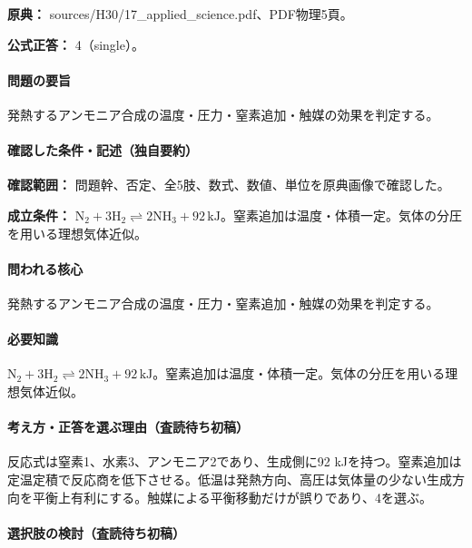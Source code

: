 \noindent\textbf{原典：} sources/H30/17\_applied\_science.pdf、PDF物理5頁。

\textbf{公式正答：} 4（single）。

\paragraph{問題の要旨} 発熱するアンモニア合成の温度・圧力・窒素追加・触媒の効果を判定する。

\paragraph{確認した条件・記述（独自要約）}\mbox{}\par

\noindent\textbf{確認範囲：} 問題幹、否定、全5肢、数式、数値、単位を原典画像で確認した。\par

\noindent\textbf{成立条件：} \(\mathrm{N_2+3H_2\rightleftharpoons2NH_3}+92\,\mathrm{kJ}\)。窒素追加は温度・体積一定。気体の分圧を用いる理想気体近似。\par

\paragraph{問われる核心} 発熱するアンモニア合成の温度・圧力・窒素追加・触媒の効果を判定する。

\paragraph{必要知識} \(\mathrm{N_2+3H_2\rightleftharpoons2NH_3}+92\,\mathrm{kJ}\)。窒素追加は温度・体積一定。気体の分圧を用いる理想気体近似。

\paragraph{考え方・正答を選ぶ理由（査読待ち初稿）} 反応式は窒素1、水素3、アンモニア2であり、生成側に92 kJを持つ。窒素追加は定温定積で反応商を低下させる。低温は発熱方向、高圧は気体量の少ない生成方向を平衡上有利にする。触媒による平衡移動だけが誤りであり、4を選ぶ。

\paragraph{選択肢の検討（査読待ち初稿）}\mbox{}\par

